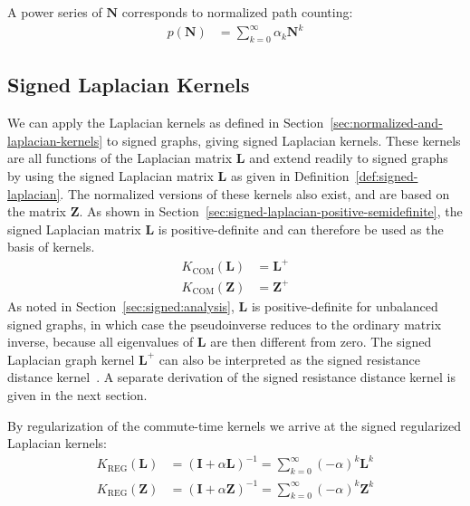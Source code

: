 \documentclass[11pt,a4paper]{book}
\begin{document}
A power series of $\mathbf N$ corresponds to normalized path counting: 
\begin{align}
  p(\mathbf N) &= \sum_{k=0}^\infty \alpha_k \mathbf N^k 
  \label{eq:signed-normalized-path-counting} 
\end{align}

\subsection{Signed Laplacian Kernels}
We can apply the Laplacian kernels as defined in
Section~\ref{sec:normalized-and-laplacian-kernels} to 
signed graphs, giving signed Laplacian kernels.  These kernels are all
functions of the Laplacian matrix $\mathbf L$ and extend readily to
signed graphs by using the signed Laplacian matrix $\mathbf L$ as
given in Definition~\ref{def:signed-laplacian}.  The normalized
versions of these 
kernels also exist, and are based on the matrix $\mathbf Z$. 
As shown in Section~\ref{sec:signed-laplacian-positive-semidefinite},
the signed Laplacian matrix 
$\mathbf L$ is positive-definite and can therefore be used as the
basis of kernels.  
\begin{align}
  K_{\mathrm{COM}}(\mathbf L) &= \mathbf L^+  
  \label{eq:signed-commute-time-kernel}
  \\
  K_{\mathrm{COM}}(\mathbf Z) &= \mathbf
  Z^+  \label{eq:signed-normalized-commute-time-kernel} 
\end{align}
As noted in
Section~\ref{sec:signed:analysis}, $\mathbf L$ is  
positive-definite for unbalanced signed graphs, in which case the pseudoinverse
reduces to the ordinary matrix inverse, because all eigenvalues of
$\mathbf L$ are then different from zero. 
The signed Laplacian graph kernel $\mathbf L^+$ can also be interpreted as the signed
resistance distance kernel~\cite{kunegis:netflix-srd}. 
A separate derivation of the signed resistance distance kernel is given
in the next section. 

By regularization of the commute-time kernels we arrive at
the signed regularized Laplacian kernels: 
\begin{align}
  K_{\mathrm{REG}}(\mathbf L) &= (\mathbf I+\alpha \mathbf L)^{-1} 
  = \sum_{k=0}^\infty (-\alpha)^k\mathbf L^k
  \label{eq:signed-regularized-laplacian-kernel} 
  \\ 
  K_{\mathrm{REG}}(\mathbf Z) &= (\mathbf I+\alpha \mathbf Z)^{-1} 
  = \sum_{k=0}^\infty (-\alpha)^k\mathbf Z^k
  \label{eq:signed-normalized-regularized-laplacian-kernel} 
\end{align}
\end{document}
